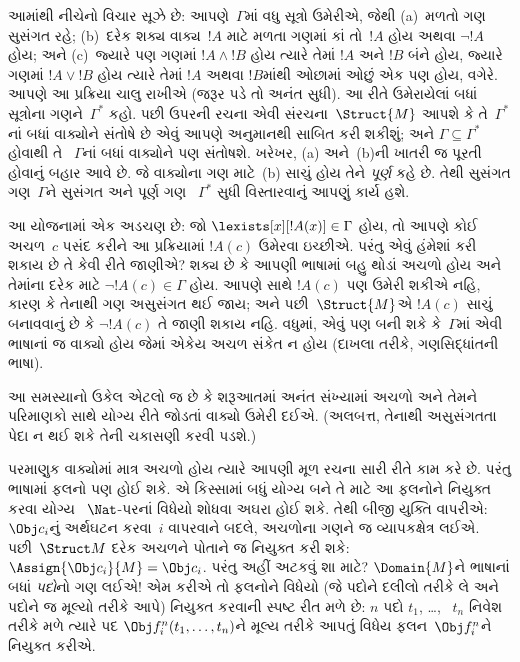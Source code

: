 આમાંથી નીચેનો વિચાર સૂઝે છે: આપણે~$\Gamma$માં વધુ સૂત્રો ઉમેરીએ,
જેથી (a)~મળતો ગણ સુસંગત રહે; (b)~દરેક શક્ય વાક્ય~$!A$ માટે
મળતા ગણમાં કાં તો~$!A$ હોય અથવા $\lnot !A$ હોય; અને (c)~જ્યારે પણ
ગણમાં $!A \land !B$ હોય ત્યારે તેમાં $!A$ અને $!B$ બંને હોય, જ્યારે
ગણમાં $!A \lor !B$ હોય ત્યારે તેમાં $!A$ અથવા $!B$માંથી ઓછામાં ઓછું એક
પણ હોય, વગેરે. આપણે આ પ્રક્રિયા ચાલુ રાખીએ (જરૂર પડે તો અનંત સુધી).
આ રીતે ઉમેરાયેલાં બધાં સૂત્રોના ગણને~$\Gamma^*$ કહો. પછી ઉપરની
રચના એવી સંરચના~$\Struct{M}$
આપશે કે તે~$\Gamma^*$નાં બધાં વાક્યોને સંતોષે છે એવું આપણે અનુમાનથી
સાબિત કરી શકીશું; અને $\Gamma \subseteq \Gamma^*$ હોવાથી તે
~$\Gamma$નાં બધાં વાક્યોને પણ સંતોષશે. ખરેખર, (a) અને~(b)ની ખાતરી જ
પૂરતી હોવાનું બહાર આવે છે. જે વાક્યોના ગણ માટે~(b) સાચું હોય તેને
\emph{પૂર્ણ} કહે છે. તેથી સુસંગત ગણ~$\Gamma$ને સુસંગત અને પૂર્ણ ગણ
~$\Gamma^*$ સુધી વિસ્તારવાનું આપણું કાર્ય હશે.



%
આ યોજનામાં એક અડચણ છે: જો $\lexists[x][!A(x)] \in \Gamma$ હોય, તો
આપણે કોઈ અચળ~$c$ પસંદ કરીને આ પ્રક્રિયામાં $!A(c)$ ઉમેરવા
ઇચ્છીએ. પરંતુ એવું હંમેશાં કરી શકાય છે તે કેવી રીતે જાણીએ? શક્ય છે કે
આપણી ભાષામાં બહુ થોડાં અચળો હોય અને તેમાંના દરેક માટે
$\lnot !A(c) \in \Gamma$ હોય. આપણે સાથે $!A(c)$ પણ ઉમેરી શકીએ નહિ,
કારણ કે તેનાથી ગણ અસુસંગત થઈ જાય; અને પછી~$\Struct{M}$એ $!A(c)$ સાચું
બનાવવાનું છે કે $\lnot !A(c)$ તે જાણી શકાય નહિ. વધુમાં, એવું પણ બની
શકે કે~$\Gamma$માં એવી ભાષાનાં જ વાક્યો હોય જેમાં એકેય અચળ સંકેત ન હોય
(દાખલા તરીકે, ગણસિદ્ધાંતની ભાષા).

આ સમસ્યાનો ઉકેલ એટલો જ છે કે શરૂઆતમાં અનંત સંખ્યામાં અચળો અને તેમને
પરિમાણકો સાથે યોગ્ય રીતે જોડતાં વાક્યો ઉમેરી દઈએ. (અલબત્ત, તેનાથી
અસુસંગતતા પેદા ન થઈ શકે તેની ચકાસણી કરવી પડશે.)

પરમાણુક વાક્યોમાં માત્ર અચળો હોય ત્યારે આપણી મૂળ રચના સારી
રીતે કામ કરે છે. પરંતુ ભાષામાં ફલનો પણ હોઈ શકે. એ કિસ્સામાં
બધું યોગ્ય બને તે માટે આ ફલનોને નિયુક્ત કરવા યોગ્ય
~$\Nat$-પરનાં વિધેયો શોધવા અઘરા હોઈ શકે. તેથી બીજી યુક્તિ વાપરીએ:
$\Obj c_i$નું અર્થઘટન કરવા~$i$ વાપરવાને બદલે, અચળોના ગણને જ
વ્યાપકક્ષેત્ર લઈએ. પછી~$\Struct M$ દરેક અચળને પોતાને જ નિયુક્ત
કરી શકે: $\Assign{\Obj c_i}{M}=\Obj c_i$. પરંતુ અહીં અટકવું શા માટે?
$\Domain{M}$ને ભાષાનાં બધાં \emph{પદો}નો ગણ લઈએ!{} એમ કરીએ તો
ફલનોને વિધેયો (જે પદોને દલીલો તરીકે લે અને પદોને જ મૂલ્યો
તરીકે આપે) નિયુક્ત કરવાની સ્પષ્ટ રીત મળે છે: $n$ પદો $t_1$, \dots,
~$t_n$ નિવેશ તરીકે મળે ત્યારે પદ $\Obj f^n_i(t_1,\dots,t_n)$ને મૂલ્ય
તરીકે આપતું વિધેય ફલન~$\Obj f^n_i$ને નિયુક્ત કરીએ.

